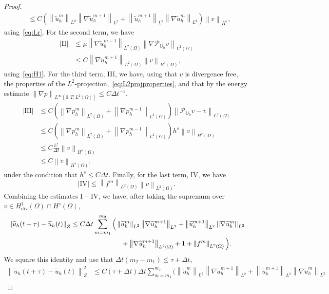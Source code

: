 \documentclass[10pt,letterpaper]{amsart}
\newcommand{\tu}{\widetilde{u}}
\newcommand\norm[1]{\left\lVert#1\right\rVert}
\newcommand{\Grad}{\nabla}
\newcommand{\Div}{\operatorname{div}}
\newcommand{\dom}{\Omega}
\newcommand{\Uh}{\mathbb{U}_h}
\newcommand{\PUh}{\mathcal{P}_{\Uh}}
\theoremstyle{definition}{\newtheorem{definition}[lemma]{Definition}}
\numberwithin{equation}{section}
\begin{document}
\begin{proof}
\begin{align*}
				& \leq C \left(\norm{\tu^m_h}_{L^2} \norm{\Grad\tu_h^{m+1}}_{L^2}+\norm{\tu^{m+1}_h}_{L^2} \norm{\Grad\tu_h^{m}}_{L^2}\right)\norm{ v}_{H^2},
	\end{align*}
	using~\eqref{eq:Lr}.
	For the second term, we have
	\begin{align*}
		|\text{II}|
		& \leq\mu \norm{\Grad \tu^{m+1}_h}_{L^2(\dom)}\norm{\Grad\PUh v}_{L^2(\dom)}\\
		& \leq C \norm{\Grad \tu^{m+1}_h}_{L^2(\dom)}\norm{ v}_{H^1(\dom)},
	\end{align*}
	using~\eqref{eq:H1}.
	For the third term, III, we have, using that $v$ is divergence free,  the properties of the $L^2$-projection,~\eqref{eq:L2projproperties}, and that by the energy estimate $\norm{\Grad p}_{L^\infty(0,T;L^2(\dom))}\leq C \Delta t^{-1}$,
 \begin{align*}
		|\text{III}|&\leq C(\norm{\Grad p^m_h}_{L^2(\dom)}+\norm{\Grad p^{m-1}_h}_{L^2(\dom)})\norm{\PUh v-v}_{L^2( \dom)}\\
		& \leq C(\norm{\Grad p^m_h}_{L^2(\dom)}+\norm{\Grad p^{m-1}_h}_{L^2(\dom)})h^s\norm{ v}_{H^s( \dom)}\\
		& \leq C \frac{h^s}{\Delta t}\norm{ v}_{H^s( \dom)}\\
		& \leq  C \norm{ v}_{H^s( \dom)},
	\end{align*}
	under the condition that $h^s\leq C {\Delta t}$.
	Finally, for the last term,  IV, we have
	\begin{equation*}
		|\text{IV}|  \leq \norm{f^m}_{ L^2(\dom)}\norm{v}_{ L^2(\dom)} .
	\end{equation*}
	Combining the estimates I -- IV, we have, after taking the supremum over $v\in H^1_{\Div}(\dom)\cap H^s(\dom)$,
	\begin{align*}
		\norm{\tu_h(t+\tau)-\tu_h(t)}_Z& \leq C \Delta t  \sum_{m=m_1}^{m_2} \Big( \norm{\tu^m_h}_{L^2} \norm{\Grad\tu_h^{m+1}}_{L^2}+\norm{\tu^{m+1}_h}_{L^2} \norm{\Grad\tu_h^{m}}_{L^2}\\
		&\quad\hphantom{\leq C \Delta t  \sum_{m=m_1}^{m_2} \Big(} + \norm{\Grad \tu^{m+1}_h}_{L^2(\dom)}+ 1+ \norm{f^m}_{ L^2(\dom)} \Big).
	\end{align*}
	We square this identity and use that $\Delta t (m_2-m_1) \leq \tau +\Delta t$,
	\begin{align*}
			\norm{\tu_h(t+\tau)-\tu_h(t)}_Z^2& \leq C (\tau+\Delta t)\Delta t  \sum_{m=m_1}^{m_2} \Big( \norm{\tu^m_h}_{L^2} \norm{\Grad\tu_h^{m+1}}_{L^2}+\norm{\tu^{m+1}_h}_{L^2} \norm{\Grad\tu_h^{m}}_{L^2}\\

\end{align*}
\end{proof}
\end{document}
